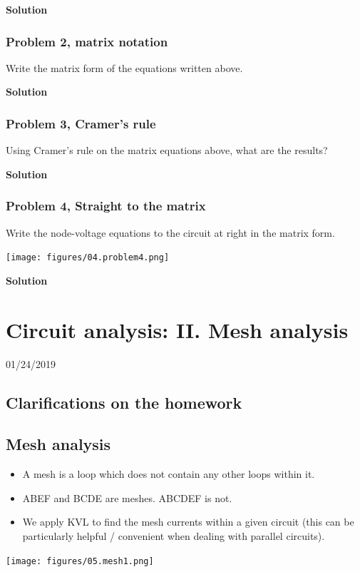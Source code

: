 \documentclass[11pt]{book}
\begin{document}
\textbf{Solution}


\subsection{Problem 2, matrix notation}
Write the matrix form of the equations written above. 


\textbf{Solution}


\subsection{Problem 3, Cramer's rule}
Using Cramer’s rule on the matrix equations above, what are the results?


\textbf{Solution}


\subsection{Problem 4, Straight to the matrix}
Write the node-voltage equations to the circuit at right in the matrix form.
\begin{center}
	\texttt{[image: figures/04.problem4.png]}
\end{center}


\textbf{Solution}









\chapter{Circuit analysis: II. Mesh analysis}
01/24/2019
\minitoc
\newpage
\section{Clarifications on the homework}

\section{Mesh analysis}
\begin{itemize}
	\item A mesh is a loop which does not contain any other loops within it.
	\item ABEF and BCDE are meshes. ABCDEF is not.
	\item We apply KVL to find the mesh currents within a given circuit (this can be particularly helpful / convenient when dealing with parallel circuits).
\end{itemize}
\begin{center}
	\texttt{[image: figures/05.mesh1.png]}
\end{center}
\end{document}
